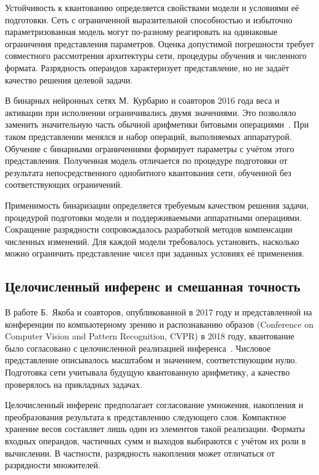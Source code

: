 Устойчивость к квантованию определяется свойствами модели и условиями
её подготовки. Сеть с ограниченной выразительной способностью
и избыточно параметризованная модель могут по-разному реагировать
на одинаковые ограничения представления параметров. Оценка
допустимой погрешности требует совместного рассмотрения архитектуры
сети, процедуры обучения и численного формата. Разрядность операндов
характеризует представление, но не задаёт качество решения целевой задачи.

В бинарных нейронных сетях М.~Курбарио и соавторов 2016 года
веса и активации при исполнении ограничивались двумя значениями.
Это позволяло заменить значительную часть обычной арифметики
битовыми операциями~\cite{bnn2016}. При таком представлении менялся и набор операций, выполняемых аппаратурой.
Обучение с бинарными ограничениями формирует параметры с учётом
этого представления. Полученная модель отличается по процедуре
подготовки от результата непосредственного однобитного квантования
сети, обученной без соответствующих ограничений.

Применимость бинаризации определяется требуемым качеством решения
задачи, процедурой подготовки модели и поддерживаемыми аппаратными
операциями. Сокращение разрядности сопровождалось разработкой
методов компенсации численных изменений. Для каждой модели требовалось установить, насколько можно ограничить
представление чисел при заданных условиях её применения.

\subsection{Целочисленный инференс и смешанная точность}

В работе Б.~Якоба и соавторов, опубликованной в 2017 году
и представленной на конференции по компьютерному зрению и распознаванию
образов (Conference on Computer Vision and Pattern Recognition, CVPR)
в 2018 году, квантование было согласовано
с целочисленной реализацией инференса~\cite{jacob2018}.
Числовое представление описывалось масштабом и значением,
соответствующим нулю. Подготовка сети учитывала будущую
квантованную арифметику, а качество проверялось на прикладных задачах.

Целочисленный инференс предполагает согласование умножения,
накопления и преобразования результата к представлению следующего
слоя. Компактное хранение весов составляет лишь один из элементов
такой реализации. Форматы входных операндов, частичных сумм и выходов выбираются с учётом их
роли в вычислении.
В частности, разрядность накопления может отличаться
от разрядности множителей.

